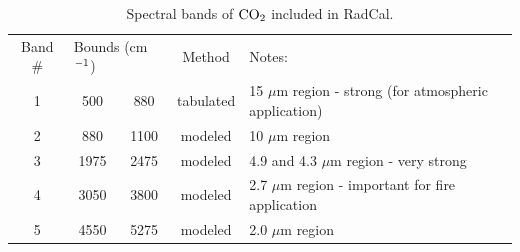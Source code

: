 \begin{table}[h!]
    \centering
    \caption{Spectral bands of $\rm CO_2$ included in RadCal.}
    \label{Table::CO2}
    \begin{tabular}{|c|c|c|c|l|}
      \hline
      Band \# & \multicolumn{2}{|l|}{Bounds (cm$\rm ^{-1}$) } & Method & Notes: \\
      \cline{1-5}
      1 &  500 & 880  & tabulated&  15 $\mu$m region - strong (for atmospheric application)\\
      2 &  880 & 1100 & modeled  & 10 $\mu$m region\\
      3 & 1975 & 2475 & modeled  & 4.9 and 4.3 $\mu$m region - very strong\\
      4 & 3050 & 3800 & modeled  & 2.7 $\mu$m region - important for fire application\\
      5 & 4550 & 5275 & modeled  & 2.0 $\mu$m region\\
      \hline
    \end{tabular}
\end{table}

